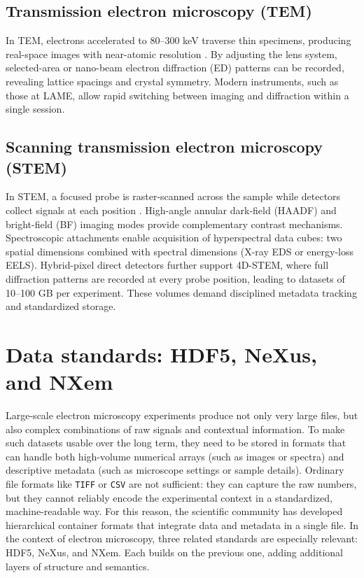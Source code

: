 \subsection{Transmission electron microscopy (TEM)}

In TEM, electrons accelerated to 80--300 keV traverse thin specimens, producing real-space images with near-atomic resolution \parencite{EMoverview}. 
By adjusting the lens system, selected-area or nano-beam electron diffraction (ED) patterns can be recorded, revealing lattice spacings and crystal symmetry. 
Modern instruments, such as those at LAME, allow rapid switching between imaging and diffraction within a single session.

\subsection{Scanning transmission electron microscopy (STEM)}

In STEM, a focused probe is raster-scanned across the sample while detectors collect signals at each position \parencite{EMoverview}. 
High-angle annular dark-field (HAADF) and bright-field (BF) imaging modes provide complementary contrast mechanisms. 
Spectroscopic attachments enable acquisition of hyperspectral data cubes: two spatial dimensions combined with spectral dimensions (X-ray EDS or energy-loss EELS). 
Hybrid-pixel direct detectors further support 4D-STEM, where full diffraction patterns are recorded at every probe position, leading to datasets of 10–100 GB per experiment. 
These volumes demand disciplined metadata tracking and standardized storage.

\section{Data standards: HDF5, NeXus, and NXem}

Large-scale electron microscopy experiments produce not only very large files, but also complex combinations of raw signals and contextual information. 
To make such datasets usable over the long term, they need to be stored in formats that can handle both high-volume numerical arrays (such as images or spectra) and descriptive metadata (such as microscope settings or sample details). 
Ordinary file formats like \texttt{TIFF} or \texttt{CSV} are not sufficient: they can capture the raw numbers, but they cannot reliably encode the experimental context in a standardized, machine-readable way. 
For this reason, the scientific community has developed hierarchical container formats that integrate data and metadata in a single file. 
In the context of electron microscopy, three related standards are especially relevant: HDF5, NeXus, and NXem. 
Each builds on the previous one, adding additional layers of structure and semantics.

